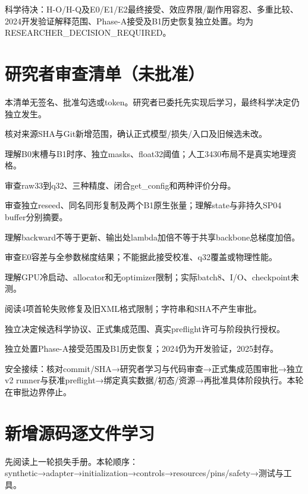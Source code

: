 \documentclass[UTF8,fontset=fandol,10pt]{ctexart}
\begin{document}
科学待决：H-O/\allowbreak{}H-Q及E0/\allowbreak{}E1/\allowbreak{}E2最终接受、效应界限/\allowbreak{}副作用容忍、多重比较、2024开发验证解释范围、Phase-A接受及B1历史恢复独立处置。均为RESEARCHER\_\allowbreak{}DECISION\_\allowbreak{}REQUIRED。
\clearpage\section{研究者审查清单（未批准）}

本清单无签名、批准勾选或token。研究者已委托先实现后学习，最终科学决定仍独立发生。

\noindent\textbullet\quad 核对来源SHA与Git新增范围，确认正式模型/\allowbreak{}损失/\allowbreak{}入口及旧候选未改。\par
\noindent\textbullet\quad 理解B0末槽与B1时序、独立masks、float32阈值；人工3430布局不是真实地理资格。\par
\noindent\textbullet\quad 审查raw33到q32、三种精度、闭合get\_\allowbreak{}config和两种评价分母。\par
\noindent\textbullet\quad 审查独立reseed、同名同形复制及两个B1原生张量；理解state与非持久SP04 buffer分别摘要。\par
\noindent\textbullet\quad 理解backward不等于更新、输出处lambda加倍不等于共享backbone总梯度加倍。\par
\noindent\textbullet\quad 审查E0容差与全参数梯度结果；不能据此接受校准、q32覆盖或物理性能。\par
\noindent\textbullet\quad 理解GPU冷启动、allocator和无optimizer限制；实际batch8、I/\allowbreak{}O、checkpoint未测。\par
\noindent\textbullet\quad 阅读4项首轮失败修复及旧XML格式限制；字符串和SHA不产生审批。\par
\noindent\textbullet\quad 独立决定候选科学协议、正式集成范围、真实preflight许可与阶段执行授权。\par
\noindent\textbullet\quad 独立处置Phase-A接受范围及B1历史恢复；2024仍为开发验证，2025封存。\par

安全接续：核对commit/\allowbreak{}SHA→研究者学习与代码审查→正式集成范围审批→独立v2 runner与获准preflight→绑定真实数据/\allowbreak{}初态/\allowbreak{}资源→再批准具体阶段执行。本轮在审批边界停止。
\clearpage\section{新增源码逐文件学习}

先阅读上一轮损失手册。本轮顺序：synthetic→adapter→initialization→controls→resources/\allowbreak{}pins/\allowbreak{}safety→测试与工具。
\end{document}
